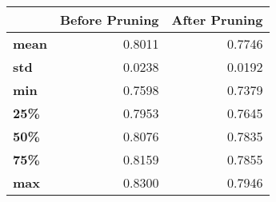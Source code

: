 \begin{tabular}{lrr}
\toprule
{} &  Before Pruning &  After Pruning \\
\midrule
\textbf{mean} &          0.8011 &         0.7746 \\
\textbf{std } &          0.0238 &         0.0192 \\
\textbf{min } &          0.7598 &         0.7379 \\
\textbf{25\% } &          0.7953 &         0.7645 \\
\textbf{50\% } &          0.8076 &         0.7835 \\
\textbf{75\% } &          0.8159 &         0.7855 \\
\textbf{max } &          0.8300 &         0.7946 \\
\bottomrule
\end{tabular}
